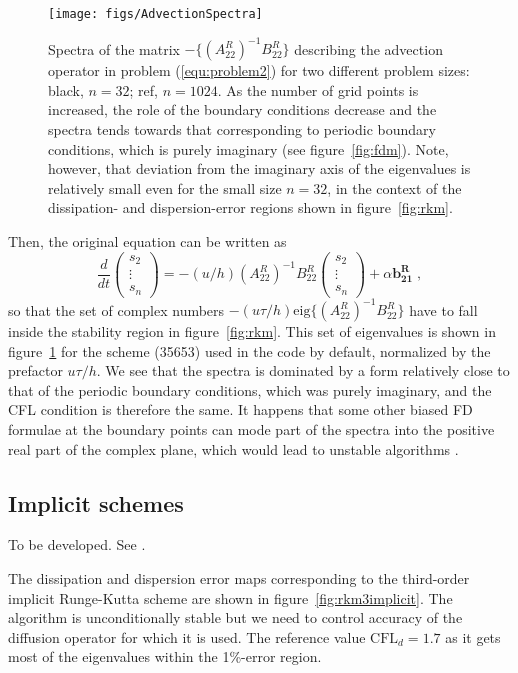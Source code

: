 {\begin{figure}
\texttt{[image: figs/AdvectionSpectra]}
\caption{Spectra of the matrix $-\{(A^R_{22})^{-1}B^R_{22}\}$ describing the
  advection operator in problem (\ref{equ:problem2}) for two different problem
  sizes: black, $n=32$; ref, $n=1024$. As the number of grid points is
  increased, the role of the boundary conditions decrease and the spectra tends
  towards that corresponding to periodic boundary conditions, which is purely
  imaginary (see figure~\ref{fig:fdm}). Note, however, that deviation from the
  imaginary axis of the eigenvalues is relatively small even for the small size
  $n=32$, in the context of the dissipation- and dispersion-error regions shown
  in figure~\ref{fig:rkm}.}\label{fig:advection}
\end{figure}

Then, the original equation can be written as
\begin{equation}
\frac{d}{dt}
\left(\begin{array}{c}s_2\\\vdots\\s_n\end{array}\right) =
-(u/h)(A^R_{22})^{-1}B^R_{22}\left(\begin{array}{c}s_2\\\vdots\\s_n\end{array}\right)+
\alpha\mathbf{b^R_{21}} \;,
\end{equation}
so that the set of complex numbers $-(u\tau/h) \textrm{eig}
\{(A^R_{22})^{-1}B^R_{22}\}$ have to fall inside the stability region in
figure~\ref{fig:rkm}. This set of eigenvalues is shown in
figure~\ref{fig:advection} for the scheme (35653) used in the code by default,
normalized by the prefactor $u\tau/h$. We see that the spectra is dominated by a
form relatively close to that of the periodic boundary conditions, which was
purely imaginary, and the CFL condition is therefore the same. It happens that
some other biased FD formulae at the boundary points can mode part of the spectra
into the positive real part of the complex plane, which would lead to unstable
algorithms \citep{Carpenter:1993}.

\subsection{Implicit schemes}

To be developed. See \cite{Spalart:1991}. 

The dissipation and dispersion error maps corresponding to the third-order
implicit Runge-Kutta scheme are shown in figure~\ref{fig:rkm3implicit}. The
algorithm is unconditionally stable but we need to control accuracy of the
diffusion operator for which it is used. The reference value
$\textrm{CFL}_d=1.7$ as it gets most of the eigenvalues within the 1\%-error
region.

}
